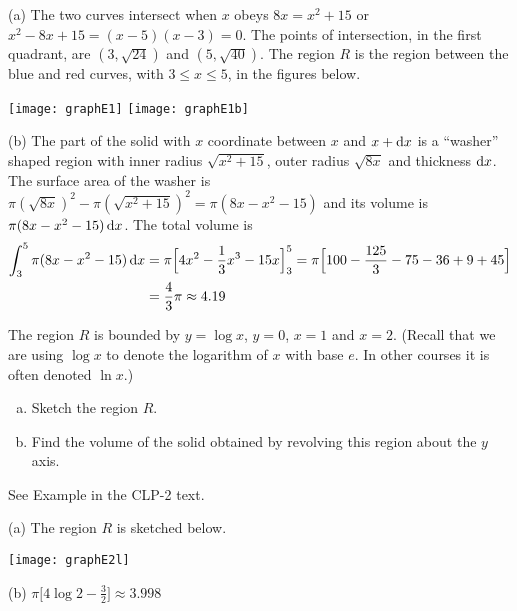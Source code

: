 \begin{solution} (a)
The two curves intersect when $x$ obeys $8x=x^2+15$
or $x^2-8x+15=(x-5)(x-3)=0$. The points of intersection, in the first quadrant,
are $(3,\sqrt{24})$ and $(5, \sqrt{40})$. The region $R$ is the region
between the blue and red curves, with $3\le x\le 5$,  in the figures below.

\begin{center}
       \texttt{[image: graphE1]}\qquad
       \texttt{[image: graphE1b]}
\end{center}

\item{}(b) The part of the solid with $x$ coordinate between $x$ and $x+\mathrm{d}x$
is a ``washer'' shaped region with inner radius $\sqrt{x^2+15}$, outer
radius $\sqrt{8x}$ and thickness $\mathrm{d}x$. The surface area of the washer is
$\pi(\sqrt{8x})^2 -\pi(\sqrt{x^2+15})^2=\pi(8x-x^2-15)$ and its volume is
$\pi(8x-x^2-15)\,\mathrm{d}x$. The total volume is
\begin{align*}
\int_3^5 \pi(8x-x^2-15)\,\mathrm{d}x
&=\pi\Big[4x^2-\frac{1}{3}x^3-15 x\Big]_3^5
=\pi\Big[100-\frac{125}{3}-75-36+9+45\Big] \\
&=\frac{4}{3}\pi\approx 4.19
\end{align*}

\end{solution}


\begin{Mquestion}[1996D] %
 The region $R$ is bounded by $y=\log x$, $y=0$, $x=1$ and $x=2$.
(Recall that we are using $\log x$ to denote the logarithm of $x$ with
base $e$. In other courses it is often denoted $\ln x$.)
\begin{enumerate}[(a)]
\item
Sketch the region $R$.
\item
Find the volume of the solid obtained by revolving this region  about the $y$ axis.
\end{enumerate}
\end{Mquestion}

\begin{hint}
See Example  in the
CLP-2 text.
\end{hint}

\begin{answer} (a)
The region $R$ is sketched below.

\begin{center}
       \texttt{[image: graphE2l]}
\end{center}

\noindent (b) $\pi\Big[4\log 2 - \frac{3}{2}\Big] \approx 3.998$
\end{answer}

